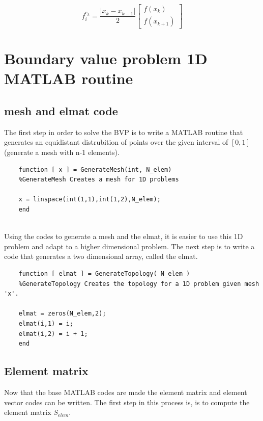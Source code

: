 \documentclass[a4paper]{report}
\begin{document}
\begin{equation}
	f^{e_k}_i =\frac{\lvert x_k-x_{k-1}\lvert}{2}
	\begin{bmatrix} f(x_{k})\\ f(x_{k+1})
	\end{bmatrix}
\end{equation}







\section{Boundary value problem 1D MATLAB routine}

\subsection{mesh and elmat code}
The first step in order to solve the BVP is to write a MATLAB routine that generates an equidistant distrubition of points over the given interval of $[0,1]$(generate a mesh with n-1 elements).

\begin{lstlisting}
	function [ x ] = GenerateMesh(int, N_elem)
	%GenerateMesh Creates a mesh for 1D problems
	
	x = linspace(int(1,1),int(1,2),N_elem);
	end
	
\end{lstlisting}
	
Using the codes to generate a mesh and the elmat, it is easier to use this 1D problem and adapt to a higher dimensional problem. The next step is to write a code that generates a two dimensional array, called the elmat.

\begin{lstlisting}
	function [ elmat ] = GenerateTopology( N_elem )
	%GenerateTopology Creates the topology for a 1D problem given mesh 'x'.
	
	elmat = zeros(N_elem,2);
	elmat(i,1) = i;
	elmat(i,2) = i + 1;
	end

\end{lstlisting}

\subsection{Element matrix}

Now that the base MATLAB codes are made the element matrix and element vector codes can be written. The first step in this process is, is to compute the element matrix $S_{elem}$.
\end{document}
